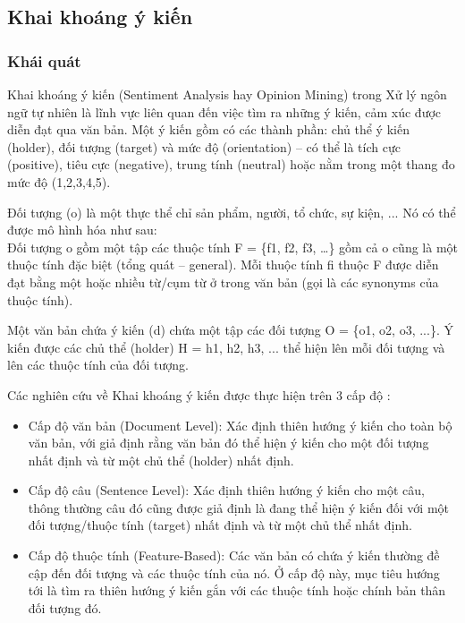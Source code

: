 \documentclass[12pt]{extarticle}
\begin{document}
		\subsection{Khai khoáng ý kiến}
			\subsubsection*{Khái quát}
				\par Khai khoáng ý kiến (Sentiment Analysis hay Opinion Mining) trong Xử lý ngôn ngữ tự nhiên là lĩnh vực liên quan đến việc tìm ra những ý kiến, cảm xúc được diễn đạt qua văn bản. Một ý kiến gồm có các thành phần: chủ thể ý kiến (holder), đối tượng (target) và mức độ (orientation) – có thể là tích cực (positive), tiêu cực (negative), trung tính (neutral) hoặc nằm trong một thang đo mức độ (1,2,3,4,5).
				\par Đối tượng (o) là một thực thể chỉ sản phẩm, người, tổ chức, sự kiện, ... Nó có thể được mô hình hóa như sau:\\				
				Đối tượng o gồm một tập các thuộc tính F = \{f1, f2, f3, …\} gồm cả o cũng là một thuộc tính đặc biệt (tổng quát – general). Mỗi thuộc tính fi thuộc F được diễn đạt bằng một hoặc nhiều từ/cụm từ ở trong văn bản (gọi là các synonyms của thuộc tính).
				\par Một văn bản chứa ý kiến (d) chứa một tập các đối tượng O = \{o1, o2, o3, ...\}. Ý kiến được các chủ thể (holder) H = {h1, h2, h3, ...} thể hiện lên mỗi đối tượng và lên các thuộc tính của đối tượng. 
				\par Các nghiên cứu về Khai khoáng ý kiến được thực hiện trên 3 cấp độ \cite{sentiment}:
				\begin{itemize}
					\item{Cấp độ văn bản (Document Level): Xác định thiên hướng ý kiến cho toàn bộ văn bản, với giả định rằng văn bản đó thể hiện ý kiến cho một đối tượng nhất định và từ một chủ thể (holder) nhất định.}		
					\item{Cấp độ câu (Sentence Level): Xác định thiên hướng ý kiến cho một câu, thông thường câu đó cũng được giả định là đang thể hiện ý kiến đối với một đối tượng/thuộc tính (target) nhất định và từ một chủ thể nhất định.}
					\item{Cấp độ thuộc tính (Feature-Based): Các văn bản có chứa ý kiến thường đề cập đến đối tượng và các thuộc tính của nó. Ở cấp độ này, mục tiêu hướng tới là tìm ra thiên hướng ý kiến gắn với các thuộc tính hoặc chính bản thân đối tượng đó.}
				\end{itemize}				
\end{document}
